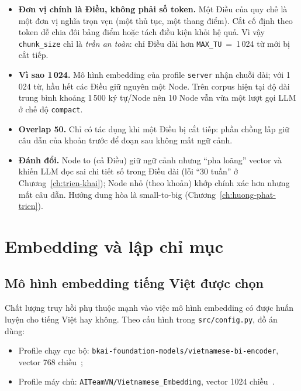 \begin{itemize}
  \item \textbf{Đơn vị chính là Điều, không phải số token.} Một Điều của quy chế là một đơn vị nghĩa trọn
        vẹn (một thủ tục, một thang điểm). Cắt cố định theo token dễ chia đôi bảng điểm hoặc tách điều
        kiện khỏi hệ quả. Vì vậy \texttt{chunk\_size} chỉ là \emph{trần an toàn}: chỉ Điều dài hơn
        \texttt{MAX\_TU}~=~1\,024 từ mới bị cắt tiếp.
  \item \textbf{Vì sao 1\,024.} Mô hình embedding của profile \texttt{server} nhận chuỗi dài; với 1\,024 từ,
        hầu hết các Điều giữ nguyên một Node. Trên corpus hiện tại độ dài trung bình khoảng 1\,500 ký tự/Node
        nên 10 Node vẫn vừa một lượt gọi LLM ở chế độ \texttt{compact}.
  \item \textbf{Overlap 50.} Chỉ có tác dụng khi một Điều bị cắt tiếp: phần chồng lấp giữ câu dẫn của khoản
        trước để đoạn sau không mất ngữ cảnh.
  \item \textbf{Đánh đổi.} Node to (cả Điều) giữ ngữ cảnh nhưng ``pha loãng'' vector và khiến LLM đọc sai chi
        tiết số trong Điều dài (lỗi ``30 tuần'' ở Chương~\ref{ch:trien-khai}); Node nhỏ (theo khoản) khớp
        chính xác hơn nhưng mất câu dẫn. Hướng dung hòa là small-to-big (Chương~\ref{ch:huong-phat-trien}).
\end{itemize}


\section{Embedding và lập chỉ mục}
\label{sec:index}

\subsection{Mô hình embedding tiếng Việt được chọn}

Chất lượng truy hồi phụ thuộc mạnh vào việc mô hình embedding có được huấn luyện cho tiếng Việt hay không. Theo cấu hình trong \texttt{src/config.py}, đồ án dùng:

\begin{itemize}
  \item Profile chạy cục bộ: \texttt{bkai-foundation-models/vietnamese-bi-encoder}, vector 768 chiều~\cite{vietnamesebiencoder};
  \item Profile máy chủ: \texttt{AITeamVN/Vietnamese\_Embedding}, vector 1024 chiều~\cite{vietnameseembedding}.
\end{itemize}

